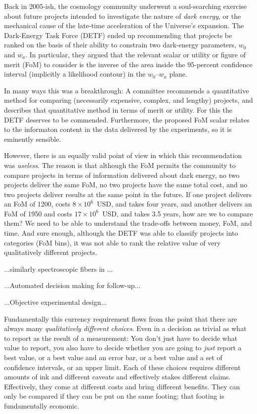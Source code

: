 \documentclass[12pt,twoside,pdftex]{article}
\begin{document}
Back in 2005-ish, the cosmology community underwent a soul-searching
exercise about future projects intended to investigate the nature of
\emph{dark energy}, or the mechanical cause of the late-time
acceleration of the Universe's expansion.  The Dark-Energy Task
Force (DETF) ended up recommending that projects be ranked on the
basis of their ability to constrain two dark-energy parameters, $w_0$
and $w_a$.  In particular, they argued that the relevant scalar or
utility or figure of merit (FoM) to consider is the inverse of the
area inside the 95-percent confidence interval (implicitly a
likelihood contour) in the $w_0$--$w_a$ plane.

In many ways this was a breakthrough: A committee recommends a
quantitative method for comparing (necessarily expensive, complex, and
lengthy) projects, and describes that quantitative method in terms of
merit or utility.  For this the DETF deserves to be commended.
Furthermore, the proposed FoM scalar relates to the informaton content
in the data delivered by the experiments, so it is eminently sensible.

However, there is an equally valid point of view in which this
recommendation was \emph{useless}.  The reason is that although the
FoM permits the community to compare projects in terms of information
delivered about dark energy, no two projects deliver the same FoM, no
two projects have the same total cost, and no two projects deliver
results at the same point in the future.  If one project delivers an
FoM of 1200, costs $8\times 10^6$~USD, and takes four years, and
another delivers an FoM of 1950 and costs $17\times 10^6$~USD, and
takes 3.5 years, how are we to compare them?  We need to be able to
understand the trade-offs between money, FoM, and time.  And sure
enough, although the DETF was able to classify projects into
categories (FoM bins), it was not able to rank the relative value of
very qualitatively different projects.

...similarly spectroscopic fibers in ...

...Automated decision making for follow-up...

...Objective experimental design...

Fundamentally this currency requirement flows from the point that
there are always many \emph{qualitatively different choices}.  Even in
a decision as trivial as what to report as the result of a
measurement: You don't just have to decide what value to report, you
also have to decide whether you are going to \emph{just} report a best
value, or a best value and an error bar, or a best value and a set of
confidence intervals, or an upper limit.  Each of these choices
requires different amounts of ink and different caveats and
effectively stakes different claims.  Effectively, they come at
different costs and bring different benefits.  They can only be
compared if they can be put on the same footing; that footing is
fundamentally economic.
\end{document}
